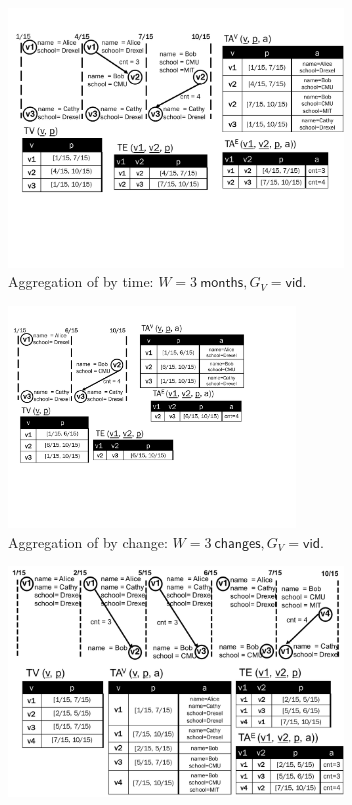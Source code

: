 \begin{figure}[t]
\begin{subfigure}[b]{0.5\textwidth}
\includegraphics[width=3.5in]{figs/agg1.pdf}
\caption{Aggregation of  by time:
  $W=3~\textsf{months}, G_V=\textsf{vid}$.}
\label{fig:tg_agg1}
\end{subfigure}
\begin{subfigure}[b]{0.4\textwidth}
\includegraphics[width=3in]{figs/agg2.pdf}
\caption{Aggregation of  by change:
  $W=3~\textsf{changes}, G_V=\textsf{vid}$.}
\label{fig:tg_agg2}
\end{subfigure}
\begin{subfigure}[b]{0.5\textwidth}
\includegraphics[width=3.5in]{figs/agg3.pdf}

\end{subfigure}
\end{figure}
